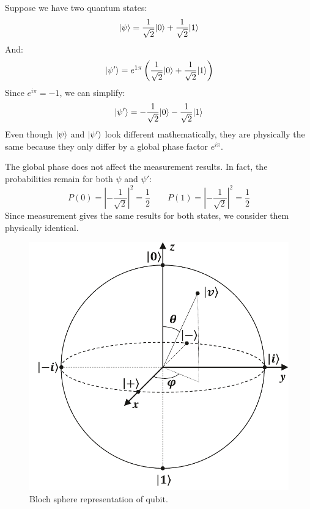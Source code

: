\begin{examplebox}
    Suppose we have two quantum states:
    \begin{equation*}
        | \psi \rangle = \dfrac{1}{\sqrt{2}}| 0 \rangle + \dfrac{1}{\sqrt{2}}| 1 \rangle
    \end{equation*}
    And:
    \begin{equation*}
        | \psi' \rangle = e^{1\pi} \left(\dfrac{1}{\sqrt{2}}| 0 \rangle + \dfrac{1}{\sqrt{2}}| 1 \rangle\right)
    \end{equation*}
    Since $e^{i\pi} = -1$, we can simplify:
    \begin{equation*}
        | \psi' \rangle = -\dfrac{1}{\sqrt{2}}| 0 \rangle -\dfrac{1}{\sqrt{2}}| 1 \rangle
    \end{equation*}
    Even though $| \psi \rangle$ and $| \psi' \rangle$ look different mathematically, they are physically the same because they only differ by a global phase factor $e^{i\pi}$.

    The global phase does not affect the measurement results. In fact, the probabilities remain for both $\psi$ and $\psi'$:
    \begin{equation*}
        P\left(0\right) = \left|-\dfrac{1}{\sqrt{2}}\right|^{2} = \dfrac{1}{2}
        \hspace{2em}
        P\left(1\right) = \left|-\dfrac{1}{\sqrt{2}}\right|^{2} = \dfrac{1}{2}
    \end{equation*}
    Since measurement gives the same results for both states, we consider them physically identical.
\end{examplebox}

\begin{figure}[!htp]
    \centering
    \includegraphics[width=.7\textwidth]{img/bloch-sphere-qubit-1.pdf}
    \caption{Bloch sphere representation of qubit.}
\end{figure}